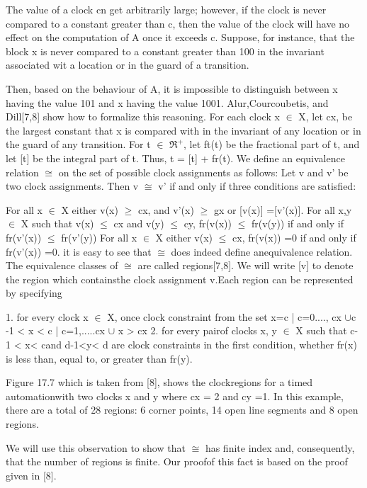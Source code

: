 The value of a clock cn get arbitrarily large; however, if the clock is never compared to a constant greater than c, then the value of the clock will have no effect on the computation of A once it exceeds c. Suppose, for instance, that the block x is never compared to a constant greater than 100 in the invariant associated wit a location or in the guard of a transition.

Then, based on the behaviour of A, it is impossible to distinguish between x having the value 101 and x having the value 1001.
Alur,Courcoubetis, and Dill[7,8] show how to formalize this reasoning. For each clock x $\in$ X, let cx, be the largest constant that x is compared with in the invariant of any location or in the guard of any transition. For t $\in$  $\Re^{+}$, let ft(t) be the fractional part of t, and let [t] be the integral part of t. Thus, t = [t] + fr(t). We define an equivalence relation $\cong$ on the set of possible clock assignments as follows: Let v and v' be two clock assignments.
Then v  $\cong$ v' if and only if three conditions are  satisfied:

For all x $\in$ X either v(x) $\geq$ cx, and v'(x) $\geq$ gx or [v(x)] =[v'(x)].
For all x,y $\in$ X such that v(x) $\leq$ cx and v(y) $\leq$ cy, fr(v(x)) $\leq$ fr(v(y)) if and only if fr(v'(x)) 
$\leq$ fr(v'(y))
For all x $\in$ X either v(x) $\leq$ cx,
fr(v(x)) =0 if and only if fr(v'(x)) =0.
it is easy to see that $\cong$ does indeed define anequivalence relation. The equivalence classes of $\cong$ are called regions[7,8].  We will write [v] to denote the region which containsthe clock assignment v.Each region can be represented by specifying

1. for every clock x $\in$ X, once clock constraint from the set {x=c | c=0...., cx} $\cup${c -1 < x < c | c=1,.....cx} $\cup$ {x > cx}
2. for every pairof clocks x, y $\in$ X such that c-1 < x< cand d-1<y< d are clock constraints in the first condition, whether fr(x) is less than, equal to, or greater than fr(y).

Figure 17.7 which is taken from [8], shows the clockregions for a timed automationwith two clocks x and y where cx = 2 and cy =1. In this example, there are a total of 28 regions: 6 corner points, 14 open line segments and 8 open regions.

We will use this observation to show that $\cong$ has finite index and, consequently, that the  number of regions is finite. Our proofof this fact is based on the proof given in [8].





